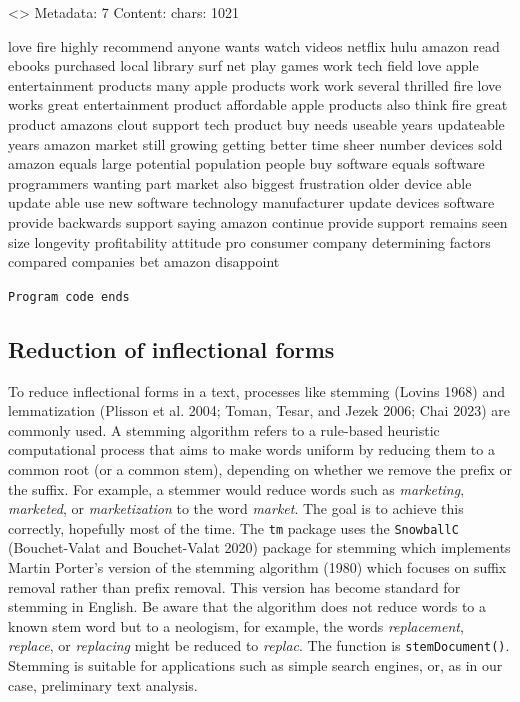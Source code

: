 \begin{Shaded}
\begin{Highlighting}[]
\OtherTok{\textless{}{-}} 

\NormalTok{(docs[[}\NormalTok{]])}
\end{Highlighting}
\end{Shaded}

\textless{}\textgreater{} Metadata: 7 Content: chars: 1021

love fire highly recommend anyone wants watch videos netflix hulu amazon
read ebooks purchased local library surf net play games work tech field
love apple entertainment products many apple products work work several
thrilled fire love works great entertainment product affordable apple
products also think fire great product amazons clout support tech
product buy needs useable years updateable years amazon market still
growing getting better time sheer number devices sold amazon equals
large potential population people buy software equals software
programmers wanting part market also biggest frustration older device
able update able use new software technology manufacturer update devices
software provide backwards support saying amazon continue provide
support remains seen size longevity profitability attitude pro consumer
company determining factors compared companies bet amazon disappoint

\texttt{Program\ code\ ends}

\subsection{Reduction of inflectional
forms}\label{sec-reduction-of-inflectional-forms}

To reduce inflectional forms in a text, processes like stemming
(Lovins 1968) and lemmatization (Plisson et al. 2004; Toman, Tesar, and
Jezek 2006; Chai 2023) are commonly used. A stemming algorithm refers to
a rule-based heuristic computational process that aims to make
words uniform by reducing them to a common root (or a common stem), depending on whether
we remove the prefix or the suffix. For example, a stemmer
would reduce words such as \emph{marketing},
\emph{marketed}, or \emph{marketization} to the word \emph{market}. The goal is to achieve this correctly, hopefully most of the time. The \texttt{tm} package uses
the \texttt{SnowballC} (Bouchet-Valat and Bouchet-Valat 2020) package
for stemming which implements Martin Porter's version of the stemming
algorithm (1980) which focuses on suffix removal rather than
prefix removal. This version has become standard for stemming in English. Be aware that the algorithm does not reduce words to a
known stem word but to a neologism, for example, the words
\emph{replacement}, \emph{replace}, or \emph{replacing} might be reduced to
\emph{replac}. The function is \texttt{stemDocument()}.
Stemming is suitable for applications such as simple search engines, or,
as in our case, preliminary text analysis.

